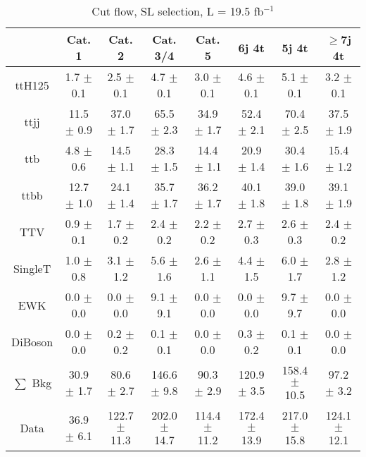 \documentclass{article}
\begin{document}
        \begin{table*}[htbp]
        \begin{center}
\label{tab:cutflow}
\begin{tabular}{| c| c| c| c| c| c| c| c| }
\hline
 & Cat. 1  & Cat. 2  & Cat. 3/4  & Cat. 5  & 6j 4t  & 5j 4t  & $\ge$7j 4t \\ \hline
ttH125 &  1.7 $\pm$ 0.1  &  2.5 $\pm$ 0.1  &  4.7 $\pm$ 0.1  &  3.0 $\pm$ 0.1  &  4.6 $\pm$ 0.1  &  5.1 $\pm$ 0.1  &  3.2 $\pm$ 0.1 \\
ttjj &  11.5 $\pm$ 0.9  &  37.0 $\pm$ 1.7  &  65.5 $\pm$ 2.3  &  34.9 $\pm$ 1.7  &  52.4 $\pm$ 2.1  &  70.4 $\pm$ 2.5  &  37.5 $\pm$ 1.9 \\
ttb &  4.8 $\pm$ 0.6  &  14.5 $\pm$ 1.1  &  28.3 $\pm$ 1.5  &  14.4 $\pm$ 1.1  &  20.9 $\pm$ 1.4  &  30.4 $\pm$ 1.6  &  15.4 $\pm$ 1.2 \\
ttbb &  12.7 $\pm$ 1.0  &  24.1 $\pm$ 1.4  &  35.7 $\pm$ 1.7  &  36.2 $\pm$ 1.7  &  40.1 $\pm$ 1.8  &  39.0 $\pm$ 1.8  &  39.1 $\pm$ 1.9 \\
TTV &  0.9 $\pm$ 0.1  &  1.7 $\pm$ 0.2  &  2.4 $\pm$ 0.2  &  2.2 $\pm$ 0.2  &  2.7 $\pm$ 0.3  &  2.6 $\pm$ 0.3  &  2.4 $\pm$ 0.2 \\
SingleT &  1.0 $\pm$ 0.8  &  3.1 $\pm$ 1.2  &  5.6 $\pm$ 1.6  &  2.6 $\pm$ 1.1  &  4.4 $\pm$ 1.5  &  6.0 $\pm$ 1.7  &  2.8 $\pm$ 1.2 \\
EWK &  0.0 $\pm$ 0.0  &  0.0 $\pm$ 0.0  &  9.1 $\pm$ 9.1  &  0.0 $\pm$ 0.0  &  0.0 $\pm$ 0.0  &  9.7 $\pm$ 9.7  &  0.0 $\pm$ 0.0 \\
DiBoson &  0.0 $\pm$ 0.0  &  0.2 $\pm$ 0.2  &  0.1 $\pm$ 0.1  &  0.0 $\pm$ 0.0  &  0.3 $\pm$ 0.2  &  0.1 $\pm$ 0.1  &  0.0 $\pm$ 0.0 \\
\hline
$\sum$ Bkg &  30.9 $\pm$ 1.7  &  80.6 $\pm$ 2.7  &  146.6 $\pm$ 9.8  &  90.3 $\pm$ 2.9  &  120.9 $\pm$ 3.5  &  158.4 $\pm$ 10.5  &  97.2 $\pm$ 3.2 \\
\hline
Data &  36.9 $\pm$ 6.1  &  122.7 $\pm$ 11.3  &  202.0 $\pm$ 14.7  &  114.4 $\pm$ 11.2  &  172.4 $\pm$ 13.9  &  217.0 $\pm$ 15.8  &  124.1 $\pm$ 12.1 \\
\hline

        \end{tabular}

\caption{Cut flow, SL selection,   L = 19.5 fb$^{-1}$ }
   
     \end{center}
        \end{table*}

        
\end{document}
